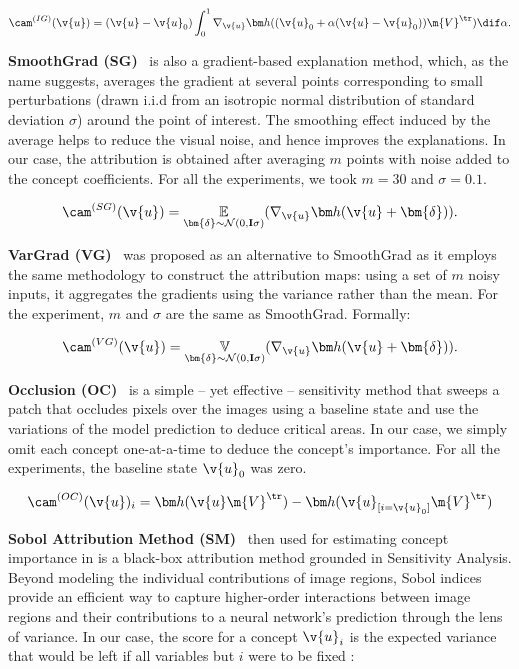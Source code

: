 $$ \cam^{(IG)}(\v{u}) = (\v{u} - \v{u}_0) \int_0^1 \nabla_{\v{u}} \fb((\v{u}_0 + \alpha(\v{u} - \v{u}_0))\m{V}^\tr) \dif\alpha. $$

\textbf{SmoothGrad (SG)}~\cite{smilkov2017smoothgrad} is also a gradient-based explanation method, which, as the name suggests, averages the gradient at several points corresponding to small perturbations (drawn i.i.d from an isotropic normal distribution of standard deviation $\sigma$) around the point of interest. The smoothing effect induced by the average helps to reduce the visual noise, and hence improves the explanations. In our case, the attribution is obtained after averaging $m$ points with noise added to the concept coefficients. For all the experiments, we took $m = 30$ and $\sigma = 0.1$.

$$ \cam^{(SG)}(\v{u}) = \underset{\bm{\delta} \sim \mathcal{N}(0, \mathbf{I}\sigma)}{\mathbb{E}}(\nabla_{\v{u}} \fb( \v{u} + \bm{\delta}) ).
$$

\textbf{VarGrad (VG)}~\cite{hooker2018benchmark} was proposed as an alternative to SmoothGrad as it employs the same methodology to construct the attribution maps: using a set of $m$ noisy inputs, it aggregates the gradients using the variance rather than the mean. For the experiment, $m$ and $\sigma$ are the same as SmoothGrad. Formally:

$$ \cam^{(VG)}(\v{u}) = \underset{\bm{\delta} \sim \mathcal{N}(0, \mathbf{I}\sigma)}{\mathbb{V}}(\nabla_{\v{u}} \fb( \v{u} + \bm{\delta}) ).
$$

\textbf{Occlusion (OC)}~\cite{zeiler2013visualizing} is a simple -- yet effective -- sensitivity method that sweeps a patch that occludes pixels over the images using a baseline state and use the variations of the model prediction to deduce critical areas. In our case, we simply omit each concept one-at-a-time to deduce the concept's importance. For all the experiments, the baseline state $\v{u}_0$ was zero.

$$ \cam^{(OC)}(\v{u})_i = \fb(\v{u} \m{V}^\tr) - \fb(\v{u}_{[i = \v{u}_0]} \m{V}^\tr)  $$


\textbf{Sobol Attribution Method (SM)}~\cite{fel2021sobol} then used for estimating concept importance in \cite{fel2023craft} is a black-box attribution method grounded in Sensitivity Analysis. Beyond modeling the individual contributions of image regions, Sobol indices provide an efficient way to capture higher-order interactions between image regions and their contributions to a neural network’s prediction through the lens of variance. In our case, the score for a concept $\v{u}_i$ is the expected variance that would be left if all variables but $i$ were to be fixed : 


